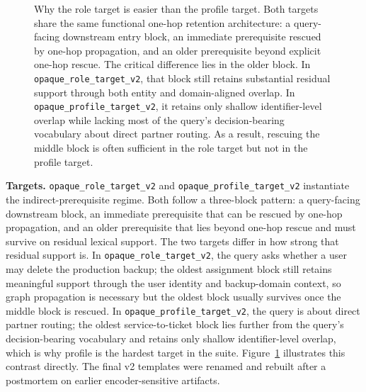 \documentclass[10pt]{article}
\begin{document}
\begin{figure}[H]
\caption{Why the role target is easier than the profile target. Both targets share the same functional one-hop retention architecture: a query-facing downstream entry block, an immediate prerequisite rescued by one-hop propagation, and an older prerequisite beyond explicit one-hop rescue. The critical difference lies in the older block. In \texttt{opaque\_role\_target\_v2}, that block still retains substantial residual support through both entity and domain-aligned overlap. In \texttt{opaque\_profile\_target\_v2}, it retains only shallow identifier-level overlap while lacking most of the query's decision-bearing vocabulary about direct partner routing. As a result, rescuing the middle block is often sufficient in the role target but not in the profile target.}
\label{fig:target-contrast}
\end{figure}

\textbf{Targets.} \texttt{opaque\_role\_target\_v2} and \texttt{opaque\_profile\_target\_v2} instantiate the indirect-prerequisite regime. Both follow a three-block pattern: a query-facing downstream block, an immediate prerequisite that can be rescued by one-hop propagation, and an older prerequisite that lies beyond one-hop rescue and must survive on residual lexical support. The two targets differ in how strong that residual support is. In \texttt{opaque\_role\_target\_v2}, the query asks whether a user may delete the production backup; the oldest assignment block still retains meaningful support through the user identity and backup-domain context, so graph propagation is necessary but the oldest block usually survives once the middle block is rescued. In \texttt{opaque\_profile\_target\_v2}, the query is about direct partner routing; the oldest service-to-ticket block lies further from the query's decision-bearing vocabulary and retains only shallow identifier-level overlap, which is why profile is the hardest target in the suite. Figure~\ref{fig:target-contrast} illustrates this contrast directly. The final v2 templates were renamed and rebuilt after a postmortem on earlier encoder-sensitive artifacts.
\end{document}
